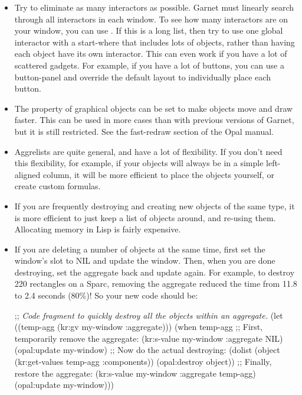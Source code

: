 \begin{itemize}
\item Try to eliminate as many interactors as possible.  Garnet must
linearly search through all interactors in each window.  To see how
many interactors are on your window, you can use
.  If this is a long list, then try to
use one global interactor with a start-where that includes lots of
objects, rather than having each object have its own interactor.  This
can even work if you have a lot of scattered gadgets.  For example, if
you have a lot of buttons, you can use a button-panel and override the
default layout to individually place each button.

\item The  property of graphical objects can be set to make
objects move and draw faster.  This can be used in more cases than
with previous versions of Garnet, but it is still restricted.  See the
fast-redraw section of the Opal manual.

\item Aggrelists are quite general, and have a lot of flexibility.  If you
don't need this flexibility, for example, if your objects will always
be in a simple left-aligned column, it will be more efficient to place
the objects yourself, or create custom formulas.

\item If you are frequently destroying and creating new objects of the same
type, it is more efficient to just keep a list of objects
around, and re-using them.  Allocating memory in Lisp is fairly
expensive.

\item 
If you are deleting a number of objects at the same time, first set
the window's  slot to NIL and update the window.
Then, when you are done destroying, set the aggregate back and update
again.  For example, to destroy 220 rectangles on a Sparc, removing the
aggregate reduced the time from 11.8 to 2.4 seconds (80\%)!
So your new code should be:
\begin{programexample}
;; {\it Code fragment to quickly destroy all the objects within an aggregate.}
(let ((temp-agg (kr:gv my-window :aggregate)))
  (when temp-agg
    ;; First, temporarily remove the aggregate:
    (kr:s-value my-window :aggregate NIL)
    (opal:update my-window)
    ;; Now do the actual destroying:
    (dolist (object (kr:get-values temp-agg :components))
      (opal:destroy object))
    ;; Finally, restore the aggregate:
    (kr:s-value my-window :aggregate temp-agg)
    (opal:update my-window)))
\end{programexample}



\end{itemize}
